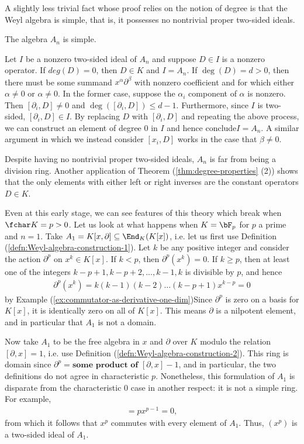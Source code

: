A slightly less trivial fact whose proof relies on the notion of degree is that the Weyl algebra is simple, that is, it possesses no nontrivial proper two-sided ideals.
\begin{thm}\label{thm:Weyl-algebra-simple}
	The algebra $A_n$ is simple.
\end{thm}
\begin{prf}
	Let $I$ be a nonzero two-sided ideal of $A_n$ and suppose $D \in I$ is a nonzero operator. If $deg(D) = 0$, then $D \in K$ and $I = A_n$. If $\deg(D) = d > 0$, then there must be some summand $x^\alpha\partial^\beta$ with nonzero coefficient and for which either $\alpha \neq 0$ or $\alpha \neq 0$. In the former case, suppose the $\alpha_i$ component of $\alpha$ is nonzero. Then $[\partial_i,D] \neq 0$ and $\deg([\partial_i,D]) \leq d - 1$. Furthermore, since $I$ is two-sided, $[\partial_i,D] \in I$. By replacing $D$ with $[\partial_i,D]$ and repeating the above process, we can construct an element of degree 0 in $I$ and hence conclude$I = A_n$. A similar argument in which we instead consider $[x_i,D]$ works in the case that $\beta \neq 0$.
\end{prf}

Despite having no nontrivial proper two-sided ideals, $A_n$ is far from being a division ring. Another application of Theorem (\ref{thm:degree-properties} (2)) shows that the only elements with either left or right inverses are the constant operators $D \in K$.

Even at this early stage, we can see features of this theory which break when $\fchar K = p > 0$. Let us look at what happens when $K = \bF_p$ for $p$ a prime and $n = 1$. Take $A_1 = K[x,\partial]\subseteq \End_K(K[x])$, i.e. let us first use Definition (\ref{defn:Weyl-algebra-construction-1}). Let $k$ be any positive integer and consider the action $\partial^p$ on $x^k \in K[x]$. If $k < p$, then $\partial^p(x^k) = 0$. If $k \geq p$, then at least one of the integers $k-p+1,k-p+2,...,k-1,k$ is divisible by $p$, and hence
\begin{align*}
	\partial^p(x^k) = k(k-1)(k-2)...(k-p+1)x^{k-p} = 0
\end{align*}
by Example (\ref{ex:commutator-as-derivative-one-dim})Since $\partial^p$ is zero on a basis for $K[x]$, it is identically zero on all of $K[x]$. This means $\partial$ is a nilpotent element, and in particular that $A_1$ is not a domain.

Now take $A_1$ to be the free algebra in $x$ and $\partial$ over $K$ modulo the relation $[\partial, x] = 1$, i.e. use Definition (\ref{defn:Weyl-algebra-construction-2}). This ring is domain since $\partial^p = \textbf{some product of $[\partial,x] - 1$}$, and in particular, the two definitions do not agree in characteristic $p$. Nonetheless, this formulation of $A_1$ is disparate from the characteristic 0 case in another respect: it is not a simple ring. For example,
\begin{align*}
	[\partial, x^p] = px^{p- 1} = 0,
\end{align*}
from which it follows that $x^p$ commutes with every element of $A_1$. Thus, $(x^p)$ is a two-sided ideal of $A_1$.

